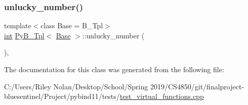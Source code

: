 \mbox{\label{class_py_b___tpl_a2bd1a6cc651f095b0ef6d2fc88a1650a}} 
\subsubsection{\texorpdfstring{unlucky\_number()}{unlucky\_number()}}
{\footnotesize\ttfamily template$<$class Base  = B\+\_\+\+Tpl$>$ \\
\mbox{\hyperlink{warnings_8h_a74f207b5aa4ba51c3a2ad59b219a423b}{int}} \mbox{\hyperlink{class_py_b___tpl}{Py\+B\+\_\+\+Tpl}}$<$ \mbox{\hyperlink{struct_base}{Base}} $>$\+::unlucky\+\_\+number (\begin{DoxyParamCaption}{ }\end{DoxyParamCaption})\hspace{0.3cm}{\ttfamily [inline]}, {\ttfamily [override]}}



The documentation for this class was generated from the following file\+:\begin{DoxyCompactItemize}
\item 
C\+:/\+Users/\+Riley Nolan/\+Desktop/\+School/\+Spring 2019/\+C\+S4850/git/finalproject-\/bluesentinel/\+Project/pybind11/tests/\mbox{\hyperlink{test__virtual__functions_8cpp}{test\+\_\+virtual\+\_\+functions.\+cpp}}\end{DoxyCompactItemize}
